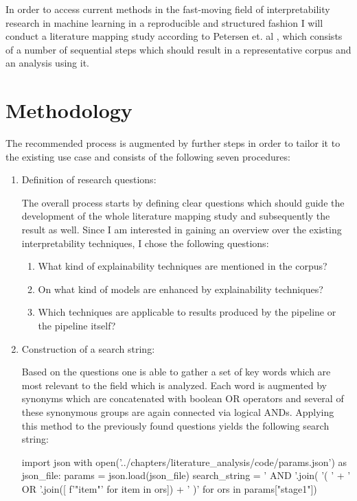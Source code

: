 In order to access current methods in the fast-moving field of interpretability research in machine learning in a reproducible and structured fashion I will conduct a literature mapping study according to Petersen et. al \cite{petersenSystematicMappingStudies}, which consists of a number of sequential steps which should result in a representative corpus and an analysis using it.

\section{Methodology}

The recommended process is augmented by further steps in order to tailor it to the existing use case and consists of the following seven procedures:
\begin{enumerate}
	
	\item Definition of research questions:
	
	The overall process starts by defining clear questions which should guide the development of the whole literature mapping study and subsequently the result as well. Since I am interested in gaining an overview over the existing interpretability techniques, I chose the following questions:
	
	\begin{enumerate}
		\item What kind of explainability techniques are mentioned in the corpus?
		\item On what kind of models are enhanced by explainability techniques?
		\item Which techniques are applicable to results produced by the pipeline or the pipeline itself?
	\end{enumerate}
	
	\item Construction of a search string:
	
	Based on the questions one is able to gather a set of key words which are most relevant to the field which is analyzed. Each word is augmented by synonyms which are concatenated with boolean OR operators and several of these synonymous groups are again connected via logical ANDs. Applying this method to the previously found questions yields the following search string:
	
\begin{pycode}
import json
with open('../chapters/literature_analysis/code/params.json') as json_file:
	params = json.load(json_file)
	search_string = ' AND '.join( '( ' + ' OR '.join([ f'"{item}"' for item in ors]) + ' )' for ors in params["stage1"])
	

\end{pycode}
\end{enumerate}
